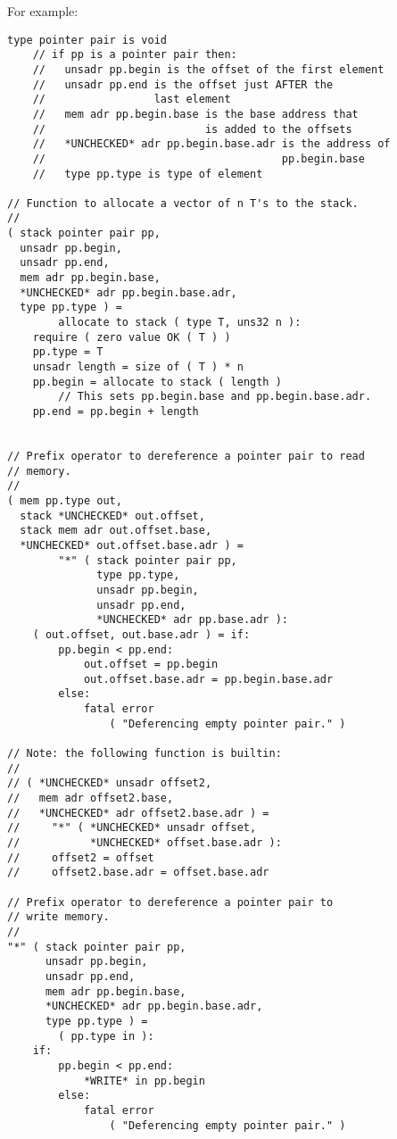 \documentclass[12pt]{article}
\newenvironment{indpar}[1][0.3in]%
	{\begin{list}{}%
		     {\setlength{\itemsep}{0in}%
		      \setlength{\topsep}{0in}%
		      \setlength{\parsep}{1ex}%
		      \setlength{\labelwidth}{#1}%
		      \setlength{\leftmargin}{#1}%
		      \addtolength{\leftmargin}{\labelsep}}%
	 \item}%
	{\end{list}}
\begin{document}
For example:
\begin{indpar}\begin{verbatim}
type pointer pair is void
    // if pp is a pointer pair then:
    //   unsadr pp.begin is the offset of the first element
    //   unsadr pp.end is the offset just AFTER the
    //                 last element
    //   mem adr pp.begin.base is the base address that
    //                         is added to the offsets
    //   *UNCHECKED* adr pp.begin.base.adr is the address of
    //                                     pp.begin.base
    //   type pp.type is type of element

// Function to allocate a vector of n T's to the stack.
//
( stack pointer pair pp,
  unsadr pp.begin,
  unsadr pp.end,
  mem adr pp.begin.base,
  *UNCHECKED* adr pp.begin.base.adr,
  type pp.type ) =
        allocate to stack ( type T, uns32 n ):
    require ( zero value OK ( T ) )
    pp.type = T
    unsadr length = size of ( T ) * n
    pp.begin = allocate to stack ( length )
        // This sets pp.begin.base and pp.begin.base.adr.
    pp.end = pp.begin + length


// Prefix operator to dereference a pointer pair to read
// memory.
//
( mem pp.type out,
  stack *UNCHECKED* out.offset,
  stack mem adr out.offset.base,
  *UNCHECKED* out.offset.base.adr ) =
        "*" ( stack pointer pair pp,
              type pp.type,
              unsadr pp.begin,
              unsadr pp.end,
              *UNCHECKED* adr pp.base.adr ):
    ( out.offset, out.base.adr ) = if:
        pp.begin < pp.end:
            out.offset = pp.begin
            out.offset.base.adr = pp.begin.base.adr
        else:
            fatal error
                ( "Deferencing empty pointer pair." )

// Note: the following function is builtin:
//
// ( *UNCHECKED* unsadr offset2,
//   mem adr offset2.base,
//   *UNCHECKED* adr offset2.base.adr ) =
//     "*" ( *UNCHECKED* unsadr offset,
//           *UNCHECKED* offset.base.adr ):
//     offset2 = offset
//     offset2.base.adr = offset.base.adr

// Prefix operator to dereference a pointer pair to
// write memory.
//
"*" ( stack pointer pair pp,
      unsadr pp.begin,
      unsadr pp.end,
      mem adr pp.begin.base,
      *UNCHECKED* adr pp.begin.base.adr,
      type pp.type ) =
        ( pp.type in ):
    if:
        pp.begin < pp.end:
            *WRITE* in pp.begin
        else:
            fatal error
                ( "Deferencing empty pointer pair." )


\end{verbatim}
\end{indpar}
\end{document}

